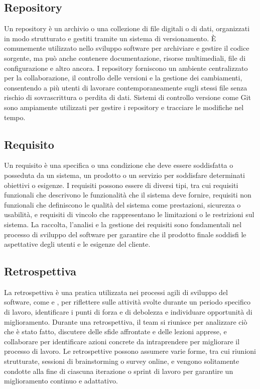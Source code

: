 \vspace{2em}
\subsection*{Repository}
Un repository è un archivio o una collezione di file digitali o di dati, organizzati in modo strutturato e gestiti tramite un sistema di versionamento. È comunemente utilizzato nello sviluppo software per archiviare e gestire il codice sorgente, ma può anche contenere documentazione, risorse multimediali, file di configurazione e altro ancora. I repository forniscono un ambiente centralizzato per la collaborazione, il controllo delle versioni e la gestione dei cambiamenti, consentendo a più utenti di lavorare contemporaneamente sugli stessi file senza rischio di sovrascrittura o perdita di dati. Sistemi di controllo versione come Git sono ampiamente utilizzati per gestire i repository e tracciare le modifiche nel tempo.

\vspace{2em}
\subsection*{Requisito}
Un requisito è una specifica o una condizione che deve essere soddisfatta o posseduta da un sistema, un prodotto o un servizio per soddisfare determinati obiettivi o esigenze. I requisiti possono essere di diversi tipi, tra cui requisiti funzionali che descrivono le funzionalità che il sistema deve fornire, requisiti non funzionali che definiscono le qualità del sistema come prestazioni, sicurezza o usabilità, e requisiti di vincolo che rappresentano le limitazioni o le restrizioni sul sistema. La raccolta, l'analisi e la gestione dei requisiti sono fondamentali nel processo di sviluppo del software per garantire che il prodotto finale soddisfi le aspettative degli utenti e le esigenze del cliente.

\vspace{2em}
\subsection*{Retrospettiva}
La retrospettiva è una pratica utilizzata nei processi agili di sviluppo del software, come  e , per riflettere sulle attività svolte durante un periodo specifico di lavoro, identificare i punti di forza e di debolezza e individuare opportunità di miglioramento. Durante una retrospettiva, il team si riunisce per analizzare ciò che è stato fatto, discutere delle sfide affrontate e delle lezioni apprese, e collaborare per identificare azioni concrete da intraprendere per migliorare il processo di lavoro. Le retrospettive possono assumere varie forme, tra cui riunioni strutturate, sessioni di brainstorming o survey online, e vengono solitamente condotte alla fine di ciascuna iterazione o sprint di lavoro per garantire un miglioramento continuo e adattativo.

